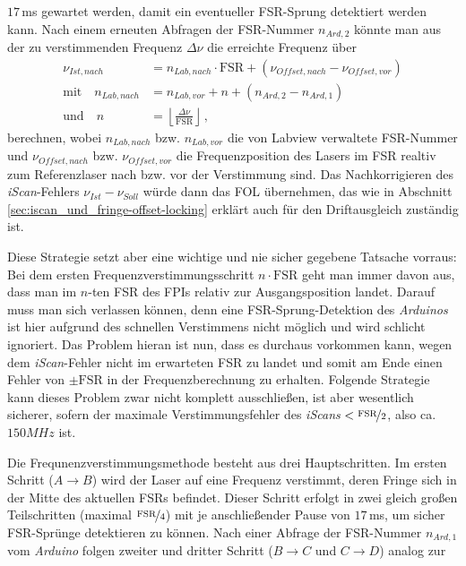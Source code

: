 $17\,$ms gewartet werden, damit ein eventueller FSR-Sprung detektiert werden
kann.
Nach einem erneuten Abfragen der FSR-Nummer $n_{Ard,2}$ könnte man aus der zu
verstimmenden Frequenz $\Delta\nu$ die erreichte Frequenz über
\begin{equation}\label{eq:neue_frequenz_strategie_1}
	\begin{split}
		\nu_{Ist,nach} &=
		n_{Lab,nach}\cdot\text{FSR}+(\nu_{Offset,nach}-\nu_{Offset,vor})\\
		\text{mit}\quad
		n_{Lab,nach} &= n_{Lab,vor}+n+(n_{Ard,2}-n_{Ard,1})\\
		\text{und}\quad
		n &= \left\lfloor\frac{\Delta\nu}{\text{FSR}}\right\rfloor\,,
	\end{split}
\end{equation}
berechnen, wobei $n_{Lab,nach}$ bzw. $n_{Lab,vor}$ die von Labview
verwaltete FSR-Nummer und $\nu_{Offset,nach}$ bzw. $\nu_{Offset,vor}$ die
Frequenzposition des Lasers im FSR realtiv zum Referenzlaser nach bzw. vor der
Verstimmung sind. Das Nachkorrigieren des \textit{iScan}-Fehlers
$\nu_{Ist}-\nu_{Soll}$ würde dann das FOL übernehmen, das wie in Abschnitt
\ref{sec:iscan_und_fringe-offset-locking} erklärt auch für den Driftausgleich
zuständig ist.\par
Diese Strategie setzt aber eine wichtige und nie sicher gegebene Tatsache
vorraus: Bei dem ersten Frequenzverstimmungsschritt $n\cdot\text{FSR}$ geht man
immer davon aus, dass man im $n$-ten FSR des FPIs relativ zur Ausgangsposition
landet. Darauf muss man sich verlassen können, denn eine FSR-Sprung-Detektion
des \textit{Arduinos} ist hier aufgrund des schnellen Verstimmens nicht möglich
und wird schlicht ignoriert. Das Problem hieran ist nun, dass es durchaus vorkommen kann,
wegen dem \textit{iScan}-Fehler nicht im erwarteten FSR zu landet und somit am
Ende einen Fehler von $\pm\text{FSR}$ in der Frequenzberechnung zu erhalten.
Folgende Strategie kann dieses Problem zwar nicht komplett ausschließen, ist aber
wesentlich sicherer, sofern der maximale Verstimmungsfehler des \textit{iScans}
$<\nicefrac{\text{FSR}}{2}$, also ca. $150MHz$ ist.\par
Die Frequnenzverstimmungsmethode besteht aus drei Hauptschritten. Im ersten
Schritt ($A\rightarrow B$) wird der Laser auf eine Frequenz verstimmt, deren
Fringe sich in der Mitte des aktuellen FSRs befindet. Dieser Schritt erfolgt in
zwei gleich großen Teilschritten (maximal $\nicefrac{\text{FSR}}{4}$) mit je
anschließender Pause von $17\,$ms, um sicher FSR-Sprünge detektieren zu können.
Nach einer Abfrage der FSR-Nummer $n_{Ard,1}$ vom \textit{Arduino} folgen zweiter und dritter Schritt ($B\rightarrow C$ und $C\rightarrow D$) analog zur
